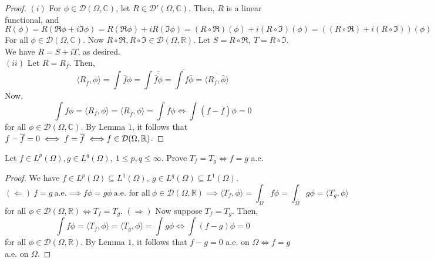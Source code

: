 \documentclass[12pt]{article}
\newenvironment{exercise}[2][Exercise]{\begin{trivlist}
\item[\hskip \labelsep {\bfseries #1}\hskip \labelsep {\bfseries #2.}]}{\end{trivlist}}
\begin{document}
\begin{proof}
  $(i)$ For $\phi \in \mathcal{D}(\Omega, \mathbb{C})$, let $R \in \mathcal{D}'(\Omega, \mathbb{C})$. Then, $R$ is a linear functional, and $$R(\phi) = R(\mathfrak{R}\phi + i \mathfrak{I} \phi) = R(\mathfrak{R}\phi) + iR(\mathfrak{I}\phi) = (R \circ \mathfrak{R})(\phi) + i(R \circ \mathfrak{I})(\phi) = ((R \circ \mathfrak{R}) + i(R \circ \mathfrak{I}))(\phi)$$
  For all $\phi \in \mathcal{D}(\Omega, \mathbb{C})$. Now $R \circ \mathfrak{R}, R \circ \mathfrak{I} \in \mathcal{D}(\Omega, \mathbb{R})$. Let $S = R \circ \mathfrak{R},\ T = R \circ \mathfrak{I}$. We have $R = S + iT$, as desired.\\
  $(ii)$ Let $R = R_f$. Then,
  $$\langle R_{\overline{f}}, \phi \rangle = \int \overline{f} \phi = \int \overline{\overline{\overline{f} \phi}} = \overline{\int f \overline{\phi}} = \overline{\langle R_f, \overline{\phi} \rangle}$$
  Now,$$\int f\phi = \langle R_f, \phi \rangle = \langle R_{\overline{f}}, \phi \rangle = \int \overline{f}\phi \iff \int (f - \overline{f}) \phi = 0$$
  for all $\phi \in \mathcal{D}(\Omega, \mathbb{C})$. By Lemma $1$, it follows that $f - \overline{f} = 0 \iff f = \overline{f} \iff \newline f \in \mathcal{D}(\Omega, \mathbb{R})$.
\end{proof}

\begin{exercise}{3}
  Let $f \in L^p(\Omega), g \in L^q(\Omega),\ 1 \le p, q \le \infty$. Prove $T_f = T_g \iff f = g$ a.e.
\end{exercise}

\begin{proof}
  We have $f \in L^p(\Omega) \subseteq L^1(\Omega),\ g \in L^q(\Omega) \subseteq L^1(\Omega)$.\\
  $$(\Leftarrow)\ f = g\ \text{a.e.} \implies f \phi = g \phi\ \text{a.e. for all}\ \phi \in \mathcal{D}(\Omega, \mathbb{R}) \implies \langle T_f, \phi \rangle = \int_{\Omega} f \phi = \int_{\Omega} g \phi = \langle T_g, \phi \rangle$$
  for all $\phi \in \mathcal{D}(\Omega, \mathbb{R}) \iff T_f = T_g$.
  $(\Rightarrow)$ Now suppose $T_f = T_g$. Then,
  $$\int f \phi = \langle T_f, \phi \rangle = \langle T_g, \phi \rangle = \int g \phi \iff \int (f - g) \phi = 0$$
  for all $\phi \in \mathcal{D}(\Omega, \mathbb{R})$. By Lemma $1$, it follows that $f - g = 0$ a.e. on $\Omega \iff f = g$ a.e. on $\Omega$.
\end{proof}
\end{document}
